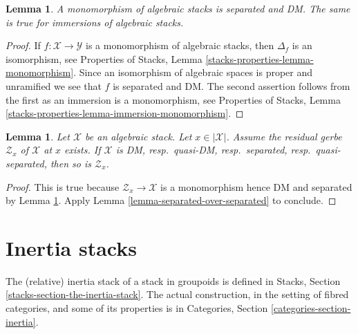 \documentclass{stacks-project}
\theoremstyle{plain}
\newtheorem{lemma}[subsection]{Lemma}
\theoremstyle{definition}
\theoremstyle{remark}
\numberwithin{equation}{subsection}
\begin{document}
\begin{lemma}
\label{lemma-monomorphism-separated}
A monomorphism of algebraic stacks is separated and DM.
The same is true for immersions of algebraic stacks.
\end{lemma}

\begin{proof}
If $f : \mathcal{X} \to \mathcal{Y}$ is a monomorphism of algebraic stacks,
then $\Delta_f$ is an isomorphism, see
Properties of Stacks, Lemma \ref{stacks-properties-lemma-monomorphism}.
Since an isomorphism of algebraic spaces is proper and unramified we
see that $f$ is separated and DM. The second assertion follows from the
first as an immersion is a monomorphism, see
Properties of Stacks,
Lemma \ref{stacks-properties-lemma-immersion-monomorphism}.
\end{proof}

\begin{lemma}
\label{lemma-separation-properties-residual-gerbe}
Let $\mathcal{X}$ be an algebraic stack. Let $x \in |\mathcal{X}|$.
Assume the residual gerbe $\mathcal{Z}_x$ of $\mathcal{X}$ at $x$ exists.
If $\mathcal{X}$ is DM, resp.\ quasi-DM, resp.\ separated,
resp.\ quasi-separated, then so is $\mathcal{Z}_x$.
\end{lemma}

\begin{proof}
This is true because $\mathcal{Z}_x \to \mathcal{X}$ is a monomorphism
hence DM and separated by
Lemma \ref{lemma-monomorphism-separated}.
Apply
Lemma \ref{lemma-separated-over-separated}
to conclude.
\end{proof}


















\section{Inertia stacks}
\label{section-inertia}

\noindent
The (relative) inertia stack of a stack in groupoids is defined in
Stacks, Section \ref{stacks-section-the-inertia-stack}.
The actual construction, in the setting of fibred categories, and some
of its properties is in
Categories, Section \ref{categories-section-inertia}.
\end{document}
